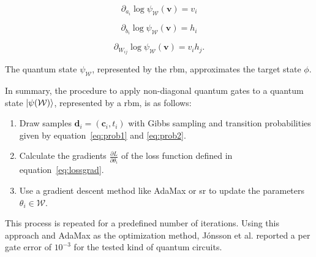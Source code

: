 \begin{equation}
    \partial_{a_i}\log{\psi_{\mathcal{W}}(\bm{v})} = v_i
\end{equation}

\begin{equation}
    \partial_{b_i}\log{\psi_{\mathcal{W}}(\bm{v})} = h_i
\end{equation}

\begin{equation}
    \partial_{W_{ij}}\log{\psi_{\mathcal{W}}(\bm{v})} = v_ih_j.
\end{equation}

The quantum state $\psi_{\mathcal{W}}$, represented by the \gls{rbm}, approximates the target state $\phi$. 

In summary, the procedure to apply non-diagonal quantum gates to a quantum state $\Ket{\psi(\mathcal{W})}$,
represented by a \gls{rbm}, is as follows:

\begin{enumerate}
    \item Draw samples $\bm{d}_i = (\bm{c}_i, t_i)$ with Gibbs sampling and transition probabilities given by equation~\ref{eq:prob1} and \ref{eq:prob2}.
    \item Calculate the gradients $\frac{\partial L}{\partial \theta_i}$ of the loss function defined in equation~\ref{eq:lossgrad}.
    \item Use a gradient descent method like AdaMax or \gls{sr} to update the parameters $\theta_i \in \mathcal{W}$.
\end{enumerate}

This process is repeated for a predefined number of iterations. Using this approach and AdaMax as the optimization method, J\'{o}nsson et al. \cite{jnsson2018neuralnetwork} reported a per gate error of $10^{-3}$ 
for the tested kind of quantum circuits.
